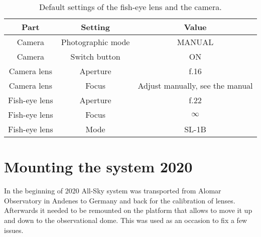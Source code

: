 \documentclass[]{book}
\begin{document}
	\begin{table} [ht]
		\caption{Default settings of the fish-eye lens and the camera.}
		\label{tab: default settings hardware}
		\begin{tabular}{ |c|c|c| } \hline
			\textbf{Part} & \textbf{Setting} & \textbf{Value} \\ \hline
			Camera & Photographic mode & MANUAL\\ \hline
			Camera & Switch button & ON\\ \hline
			Camera lens & Aperture & f.16\\ \hline
			Camera lens & Focus & Adjust manually, see the manual\\ \hline
			Fish-eye lens & Aperture & f.22\\ \hline
			Fish-eye lens & Focus & $ \infty $\\ \hline
			Fish-eye lens & Mode & SL-1B\\ \hline
		\end{tabular}
	\end{table}
	
	\section{Mounting the system 2020}
	
	In the beginning of 2020 All-Sky system was transported from Alomar Observatory in Andenes to Germany and back for the calibration of lenses. Afterwards it needed to be remounted on the platform that allows to move it up and down to the observational dome. This was used as an occasion to fix a few issues.
	
\end{document}
